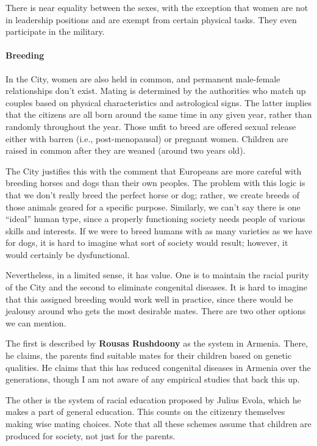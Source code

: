 There is near equality between the sexes, with the exception that women are not in leadership positions and are exempt from certain physical tasks. They even participate in the military.

\paragraph{Breeding}


In the City, women are also held in common, and permanent male-female relationships don't exist. Mating is determined by the authorities who match up couples based on physical characteristics and astrological signs. The latter implies that the citizens are all born around the same time in any given year, rather than randomly throughout the year. Those unfit to breed are offered sexual release either with barren (i.e., post-menopausal) or pregnant women. Children are raised in common after they are weaned (around two years old).

The City justifies this with the comment that Europeans are more careful with breeding horses and dogs than their own peoples. The problem with this logic is that we don't really breed the perfect horse or dog; rather, we create breeds of those animals geared for a specific purpose. Similarly, we can't say there is one ``ideal'' human type, since a properly functioning society needs people of various skills and interests. If we were to breed humans with as many varieties as we have for dogs, it is hard to imagine what sort of society would result; however, it would certainly be dysfunctional.

Nevertheless, in a limited sense, it has value. One is to maintain the racial purity of the City and the second to eliminate congenital diseases. It is hard to imagine that this assigned breeding would work well in practice, since there would be jealousy around who gets the most desirable mates. There are two other options we can mention.

The first is described by \textbf{Rousas Rushdoony} as the system in Armenia. There, he claims, the parents find suitable mates for their children based on genetic qualities. He claims that this has reduced congenital diseases in Armenia over the generations, though I am not aware of any empirical studies that back this up.

The other is the system of racial education proposed by Julius Evola, which he makes a part of general education. This counts on the citizenry themselves making wise mating choices. Note that all these schemes assume that children are produced for society, not just for the parents.

